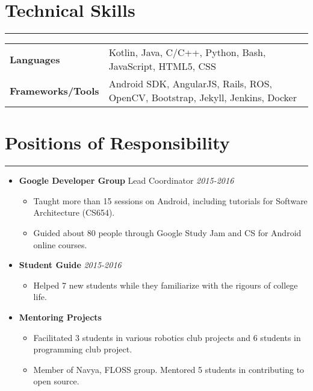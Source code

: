 \documentclass[a4paper]{article}
\begin{document}
\section*{Technical Skills}
\hrule
\vspace{3mm}
\begin{tabular}{@{}m{4.0cm}m{13cm}@{}}
	\textbf{\textrm{Languages}}        & Kotlin, Java, C/C++, Python, Bash, JavaScript, HTML5, CSS\\
	\textbf{\textrm{Frameworks/Tools}} & Android SDK, AngularJS, Rails, ROS, OpenCV, Bootstrap, Jekyll, Jenkins, Docker\\
\end{tabular}

\section*{Positions of Responsibility}
\hrule
\vspace{3mm}
\begin{itemize}
	\item
	      \textbf{Google Developer Group} Lead Coordinator
	      \hfill \textit{2015-2016}
	      \begin{itemize}
	      	\vspace{-2mm} \setlength\itemsep{-0.2em}
		\item Taught more than 15 sessions on Android, including tutorials for Software Architecture (CS654).
		\item Guided about 80 people through Google Study Jam and CS for Android online courses.
	      \end{itemize}
	\item
	      \textbf{Student Guide}
	      \hfill \textit{2015-2016}
	      \begin{itemize}
	      	\vspace{-2mm} \setlength\itemsep{-0.2em}
		\item Helped 7 new students while they familiarize with the rigours of college life.
	      \end{itemize}
	\item
	      \textbf{Mentoring Projects}
	      \begin{itemize}
	      	\vspace{-2mm} \setlength\itemsep{-0.2em}
	      	\item Facilitated 3 students in various robotics club projects and 6 students in programming club project.
	      	\item Member of Navya, FLOSS group. Mentored 5 students in contributing to open source.
	      \end{itemize}
\end{itemize}
\end{document}
